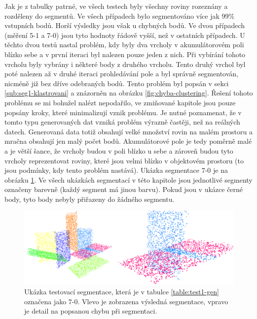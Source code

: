 \documentclass[11pt,twoside,a4paper]{book}
\begin{document}
Jak je z tabulky patrné, ve všech testech byly všechny roviny rozeznány a rozděleny do segmentů. Ve všech případech bylo segmentováno více jak 99\% vstupních bodů. Horší výsledky jsou však u chybných bodů. Ve dvou případech (měření 5-1 a 7-0) jsou tyto hodnoty řádově vyšší, než v ostatních případech. U těchto dvou testů nastal problém, kdy byly dva vrcholy v akumulátorovém poli blízko sebe a v první iteraci byl nalezen pouze jeden z nich. Při vybírání tohoto vrcholu byly vybrány i některé body z druhého vrcholu. Tento druhý vrchol byl poté nalezen až v druhé iteraci prohledávání pole a byl správně segmentován, nicméně již bez dříve odebraných bodů. Tento problém byl popsán v sekci \ref{sub:seg1-klastrovani} a znázorněn na obrázku \ref{fig:chyba-clustering}. Řešení tohoto problému se mi bohužel nalézt nepodařilo, ve zmiňované kapitole jsou pouze popsány kroky, které minimalizují vznik problému. Je nutné poznamenat, že v tomto typu generovaných dat vzniká problém výrazně častěji, než na reálných datech. Generovaná data totiž obsahují velké množství rovin na malém prostoru a mračna obsahují jen malý počet bodů. Akumulátorové pole je tedy poměrně malé a je větší šance, že vrcholy budou v poli blízko u sebe a zároveň budou tyto vrcholy reprezentovat roviny, které jsou velmi blízko v objektovém prostoru (to jsou podmínky, kdy tento problém nastává). Ukázka segmentace 7-0 je na obrázku \ref{fig:test-chyba-1}. Ve všech ukázkách segmentací v této kapitole jsou jednotlivé segmenty označeny barevně (každý segment má jinou barvu). Pokud jsou v ukázce černé body, tyto body nebyly přiřazeny do žádného segmentu.

\begin{figure}[H]
\begin{center}
\includegraphics[width=\textwidth]{figures/test-chyba-1}
\caption{Ukázka testovací segmentace, která je v tabulce \ref{table:test1-gen} označena jako 7-0. Vlevo je zobrazena výsledná segmentace, vpravo je detail na popsanou chybu při segmentaci.}
\label{fig:test-chyba-1}
\end{center}
\end{figure}
\end{document}
